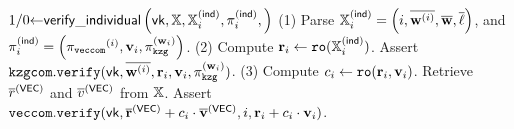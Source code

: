 \begin{scriptsize}
\begin{algorithm*}[bt]
$ 1/0 {\leftarrow} \mathsf{verify\_individual}\left(\mathsf{vk}, 
		\mathbb{X},
		\mathbb{X}^{\mathsf{(ind)}}_{i},
		\pi^{\mathsf{(ind)}}_{i},
		\right)$ 
\newline
(1) Parse $\mathbb{X}^{\mathsf{(ind)}}_{i} = \left(i, \overline{{{\mathbf {w}}}^{(i)}}, \overline{{{\mathbf {w}}}},
	\overline{{{\mathbf {\ell}}}}\right)$, 
	and 
	$\pi^{\mathsf{(ind)}}_{i} = \left({\pi_{\texttt{veccom}}}^{(i)}, {{\mathbf {v}}}_i, {\pi_{\texttt{kzg}}^{({{\mathbf {w}}}_i)}}
	\right)$.	 \newline
(2) Compute ${{\mathbf {r}}}_i \leftarrow \texttt{ro}(\mathbb{X}^{\mathsf{(ind)}}_{i})$.
Assert $\mathtt{kzgcom.verify}(\mathsf{vk}, \overline{{{\mathbf {w}}}^{(i)}}, {{\mathbf {r}}}_i, {{\mathbf {v}}}_i, {\pi_{\texttt{kzg}}^{({{\mathbf {w}}}_i)}})$. \newline
(3) Compute $c_i \leftarrow \texttt{ro}({{\mathbf {r}}}_i, {{\mathbf {v}}}_i)$.
Retrieve $\overline{r}^{(\mathsf{VEC})}$ and $\overline{v}^{(\mathsf{VEC})}$ from $\mathbb{X}$.
Assert $\mathtt{veccom.verify}(\mathsf{vk}, \overline{{{\mathbf {r}}}}^{(\mathsf{VEC})} + c_i \cdot
	\overline{{{\mathbf {v}}}}^{(\mathsf{VEC})}, i, {{\mathbf {r}}}_i + c_i \cdot {{\mathbf {v}}}_i)$.



	


\caption{Main Framework for Generating Batch and Individual Proof}
\label{fig:main}
\end{algorithm*}
\end{scriptsize}
